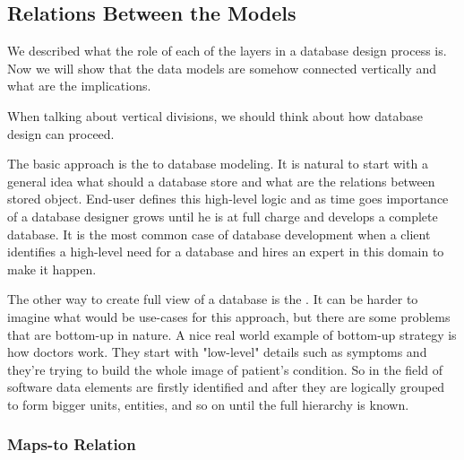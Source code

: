 \subsection{Relations Between the Models}

We described what the role of each of the layers in a database design process is.
Now we will show that the data models are somehow connected vertically and what are the implications.

When talking about vertical divisions, we should think about how database design can proceed.

The basic approach is the  to database modeling.
It is natural to start with a general idea what should a database store and what are the relations between stored object. 
End-user defines this high-level logic and as time goes importance of a database designer grows until he is at full charge and develops a complete database. It is the most common case of database development when a client identifies a high-level need for a database and hires an expert in this domain to make it happen.

The other way to create full view of a database is the . It can be harder to imagine what would be use-cases for this approach, but there are some problems that are bottom-up in nature. A nice real world example of bottom-up strategy is how doctors work. 
They start with "low-level" details such as symptoms and they're trying to build the whole image of patient's condition. So in the field of software data elements are firstly identified and after they are logically grouped to form bigger units, entities, and so on until the full hierarchy is known.

\subsubsection{Maps-to Relation}

